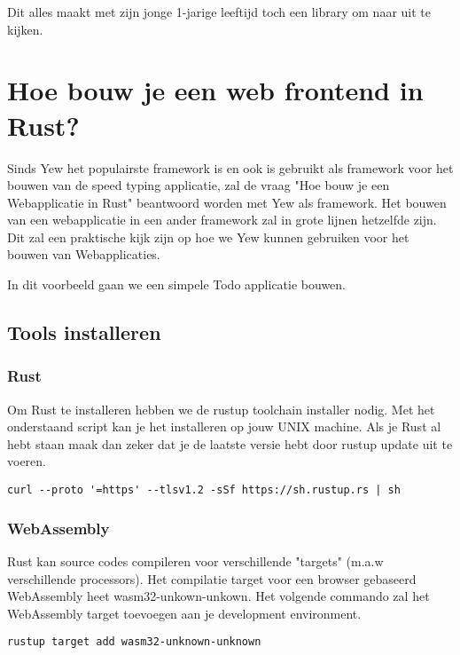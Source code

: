 Dit alles maakt met zijn jonge 1-jarige leeftijd toch een library om naar uit te kijken. 

\section{Hoe bouw je een web frontend in Rust?}

Sinds Yew het populairste framework is en ook is gebruikt als framework voor het bouwen van de speed
typing applicatie, zal de vraag "Hoe bouw je een Webapplicatie in Rust" beantwoord worden met Yew
als framework. Het bouwen van een webapplicatie in een ander framework zal in grote lijnen hetzelfde
zijn. Dit zal een praktische kijk zijn op hoe we Yew kunnen gebruiken voor het bouwen van
Webapplicaties.  

In dit voorbeeld gaan we een simpele Todo applicatie bouwen.

\subsection{Tools installeren}

\subsubsection{Rust}
Om Rust te installeren hebben we de rustup toolchain installer nodig. Met het onderstaand script kan
je het installeren op jouw UNIX machine. Als je Rust al hebt staan maak dan zeker dat je de laatste
versie hebt door rustup update uit te voeren.

\begin{verbatim}
curl --proto '=https' --tlsv1.2 -sSf https://sh.rustup.rs | sh
\end{verbatim}

\subsubsection{WebAssembly}

Rust kan source codes compileren voor verschillende "targets" (m.a.w verschillende processors). Het
compilatie target voor een browser gebaseerd WebAssembly heet wasm32-unkown-unkown. Het volgende
commando zal het WebAssembly target toevoegen aan je development environment.

\begin{verbatim}
rustup target add wasm32-unknown-unknown
\end{verbatim}

\clearpage

